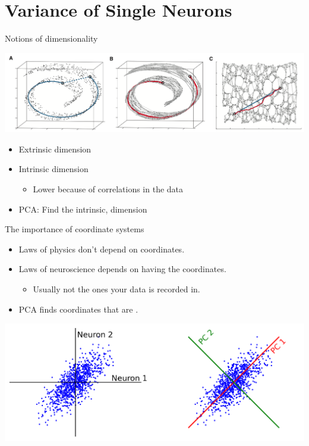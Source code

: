 \documentclass[presentation,smaller]{beamer}
\begin{document}
\section{Variance of Single Neurons}
\label{sec:org0e4e7ea}
\begin{frame}[label={sec:orga3fb8d1}]{Notions of dimensionality}
\begin{center}
\includegraphics[width=1.0\textwidth]{figures/swiss_roll.png}
\end{center}  
\begin{itemize}
\item Extrinsic dimension
\item Intrinsic dimension
\begin{itemize}
\item Lower because of correlations in the data
\end{itemize}
\item PCA: Find the intrinsic,  dimension
\end{itemize}
\end{frame}
\begin{frame}[label={sec:orgb53fa03}]{The importance of coordinate systems}
\begin{itemize}
\item Laws of physics don't depend on coordinates.
\item Laws of neuroscience depends on having the  coordinates.
\begin{itemize}
\item Usually not the ones your data is recorded in.
\end{itemize}
\item PCA finds coordinates that are .
\end{itemize}
\begin{center}
\includegraphics[width=1.0\textwidth]{figures/pca_illustration.png}
\end{center}  
\end{frame}
\end{document}
